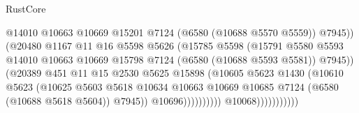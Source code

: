 \begin{lexlean}{RustCore}
\begin{coremodule}
                                            @14010
                                            @10663
                                            @10669
                                            @15201
                                            @7124
                                            (@6580 (@10688 @5570 @5559))
                                            @7945))
                                        (@20480
                                          @1167
                                          @11
                                          @16
                                          @5598
                                          @5626
                                          (@15785
                                            @5598
                                            (@15791
                                              @5580
                                              @5593
                                              @14010
                                              @10663
                                              @10669
                                              @15798
                                              @7124
                                              (@6580 (@10688 @5593 @5581))
                                              @7945))
                                          (@20389
                                            @451
                                            @11
                                            @15
                                            @2530
                                            @5625
                                            @15898
                                            (@10605
                                              @5623
                                              @1430
                                              (@10610
                                                @5623
                                                (@10625
                                                  @5603
                                                  @5618
                                                  @10634
                                                  @10663
                                                  @10669
                                                  @10685
                                                  @7124
                                                  (@6580 (@10688 @5618 @5604))
                                                  @7945))
                                              @10696))))))))))
                          @10068)))))))))))

\end{coremodule}
\end{lexlean}
